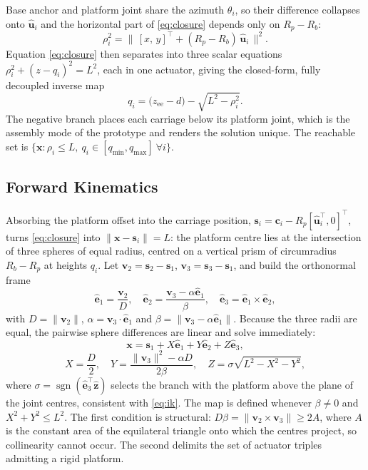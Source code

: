 Base anchor and platform joint share the azimuth $\theta_i$, so their difference
collapses onto $\hat{\mathbf{u}}_i$ and the horizontal part of
\eqref{eq:closure} depends only on $R_p-R_b$:
\begin{equation}
\label{eq:rho}
\rho_i^2 = \big\|\,[x,\,y]^{\!\top} + (R_p-R_b)\,\hat{\mathbf{u}}_i \,\big\|^2 .
\end{equation}
Equation \eqref{eq:closure} then separates into three scalar equations
$\rho_i^2+(z-q_i)^2=L^2$, each in one actuator, giving the closed-form,
fully decoupled inverse map
\begin{equation}
\label{eq:ik}
q_i = \big(z_{\text{ee}}-d\big) - \sqrt{L^2-\rho_i^2}.
\end{equation}
The negative branch places each carriage below its platform joint, which is the
assembly mode of the prototype and renders the solution unique. The reachable
set is $\{\mathbf{x} : \rho_i \le L,\ q_i \in [q_{\min},q_{\max}]\ \forall i\}$.

\subsection{Forward Kinematics}

Absorbing the platform offset into the carriage position,
$\mathbf{s}_i = \mathbf{c}_i - R_p[\hat{\mathbf{u}}_i^{\!\top},0]^{\!\top}$,
turns \eqref{eq:closure} into $\|\mathbf{x}-\mathbf{s}_i\|=L$: the platform
centre lies at the intersection of three spheres of equal radius, centred on a
vertical prism of circumradius $R_b-R_p$ at heights $q_i$. Let
$\mathbf{v}_2=\mathbf{s}_2-\mathbf{s}_1$, $\mathbf{v}_3=\mathbf{s}_3-\mathbf{s}_1$,
and build the orthonormal frame
\begin{equation}
\hat{\mathbf{e}}_1=\frac{\mathbf{v}_2}{D},\quad
\hat{\mathbf{e}}_2=\frac{\mathbf{v}_3-\alpha\hat{\mathbf{e}}_1}{\beta},\quad
\hat{\mathbf{e}}_3=\hat{\mathbf{e}}_1\times\hat{\mathbf{e}}_2,
\end{equation}
with $D=\|\mathbf{v}_2\|$, $\alpha=\mathbf{v}_3\!\cdot\!\hat{\mathbf{e}}_1$ and
$\beta=\|\mathbf{v}_3-\alpha\hat{\mathbf{e}}_1\|$. Because the three radii are
equal, the pairwise sphere differences are linear and solve immediately:
\begin{equation}
\label{eq:fk}
\mathbf{x}=\mathbf{s}_1+X\hat{\mathbf{e}}_1+Y\hat{\mathbf{e}}_2+Z\hat{\mathbf{e}}_3,
\end{equation}
\begin{equation}
X=\frac{D}{2},\quad
Y=\frac{\|\mathbf{v}_3\|^2-\alpha D}{2\beta},\quad
Z=\sigma\sqrt{L^{2}-X^{2}-Y^{2}},
\end{equation}
where $\sigma=\operatorname{sgn}(\hat{\mathbf{e}}_3^{\!\top}\hat{\mathbf{z}})$
selects the branch with the platform above the plane of the joint centres,
consistent with \eqref{eq:ik}. The map is defined whenever $\beta\neq0$ and
$X^2+Y^2\le L^2$. The first condition is structural: $D\beta =
\|\mathbf{v}_2\times\mathbf{v}_3\| \ge 2A$, where $A$ is the constant area of
the equilateral triangle onto which the centres project, so collinearity cannot
occur. The second delimits the set of actuator triples admitting a rigid
platform.

